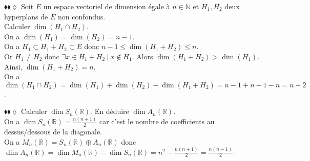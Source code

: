 \documentclass[11pt]{article}
\newcommand*{\R}{\mathbb{R}}
\newcommand*{\N}{\mathbb{N}}
\begin{document}
\begin{exercise}{$\blacklozenge\blacklozenge\lozenge$}{}
    Soit $E$ un espace vectoriel de dimension égale à $n\in\N$ et $H_1,H_2$ deux hyperplans de $E$ non confondus.\\
    Calculer $\dim(H_1 \cap H_2)$.
    \tcblower\\[0.2cm]
    On a $\dim(H_1) = \dim(H_2) = n-1$.\\
    On a $H_1 \subset H_1 + H_2 \subset E$ donc $n-1 \leq \dim(H_1 + H_2) \leq n$.\\
    Or $H_1 \neq H_2$ donc $\exists x \in H_1 + H_2 ~ | ~ x \notin H_1$. Alors $\dim(H_1 + H_2) > \dim(H_1)$.\\
    Ainsi, $\dim(H_1 + H_2) = n$.\\
    On a $\dim(H_1 \cap H_2) = \dim(H_1) + \dim(H_2) - \dim(H_1 + H_2) = n - 1 + n - 1 - n = n - 2$.
\end{exercise}

\begin{exercise}{$\blacklozenge\blacklozenge\lozenge$}{}
    Calculer $\dim S_n(\R)$. En déduire $\dim A_n(\R)$.
    \tcblower\\[0.2cm]
    On a $\dim S_n(\R) = \frac{n(n+1)}{2}$ car c'est le nombre de coefficients au dessus/dessous de la diagonale.\\
    On a $M_n(\R) = S_n(\R) \oplus A_n(\R)$ donc $\dim A_n(\R) = \dim M_n(\R) - \dim S_n(\R) = n^2 - \frac{n(n+1)}{2} = \frac{n(n-1)}{2}$.
    
\end{exercise}
\end{document}
